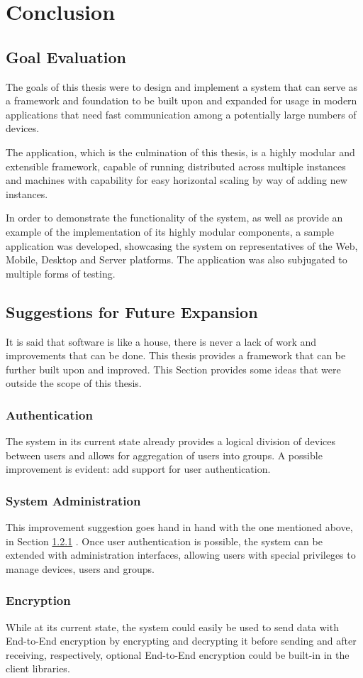 \chapter{Conclusion}

\section{Goal Evaluation}

The goals of this thesis were to design and implement a system that can serve as a framework and foundation to be built upon and expanded for usage in modern applications that need fast communication among a potentially large numbers of devices. 

The application, which is the culmination of this thesis, is a highly modular and extensible framework, capable of running distributed across multiple instances and machines with capability for easy horizontal scaling by way of adding new instances.

In order to demonstrate the functionality of the system, as well as provide an example of the implementation of its highly modular components, a sample application was developed, showcasing the system on representatives of the Web, Mobile, Desktop and Server platforms. The application was also subjugated to multiple forms of testing.

\section{Suggestions for Future Expansion}
It is said that software is like a house, there is never a lack of work and improvements that can be done. This thesis provides a framework that can be further built upon and improved. This Section provides some ideas that were outside the scope of this thesis.

\subsection{Authentication} \label{conc:auth}
The system in its current state already provides a logical division of devices between users and allows for aggregation of users into groups. A possible improvement is evident: add support for user authentication.

\subsection{System Administration}
This improvement suggestion goes hand in hand with the one mentioned above, in Section \ref{conc:auth} . Once user authentication is possible, the system can be extended with administration interfaces, allowing users with special privileges to manage devices, users and groups.

\subsection{Encryption}
While at its current state, the system could easily be used to send data with End-to-End encryption by encrypting and decrypting it before sending and after receiving, respectively, optional End-to-End encryption could be built-in in the client libraries.
